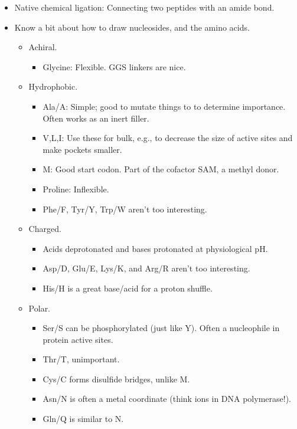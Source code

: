 \documentclass[../notes.tex]{subfiles}
\begin{document}
\begin{itemize}
\begin{itemize}
    \end{itemize}
    \item Native chemical ligation: Connecting two peptides with an amide bond.
    \item Know a bit about how to draw nucleosides, and the amino acids.
    \begin{itemize}
        \item Achiral.
        \begin{itemize}
            \item Glycine: Flexible. GGS linkers are nice.
        \end{itemize}
        \item Hydrophobic.
        \begin{itemize}
            \item Ala/A: Simple; good to mutate things to to determine importance. Often works as an inert filler.
            \item V,L,I: Use these for bulk, e.g., to decrease the size of active sites and make pockets smaller.
            \item M: Good start codon. Part of the cofactor SAM, a methyl donor.
            \item Proline: Inflexible.
            \item Phe/F, Tyr/Y, Trp/W aren't too interesting.
        \end{itemize}
        \item Charged.
        \begin{itemize}
            \item Acids deprotonated and bases protonated at physiological pH.
            \item Asp/D, Glu/E, Lys/K, and Arg/R aren't too interesting.
            \item His/H is a great base/acid for a proton shuffle.
        \end{itemize}
        \item Polar.
        \begin{itemize}
            \item Ser/S can be phosphorylated (just like Y). Often a nucleophile in protein active sites.
            \item Thr/T, unimportant.
            \item Cys/C forms disulfide bridges, unlike M.
            \item Asn/N is often a metal coordinate (think  ions in DNA polymerase!).
            \item Gln/Q is similar to N.

\end{itemize}
\end{itemize}
\end{itemize}
\end{document}
